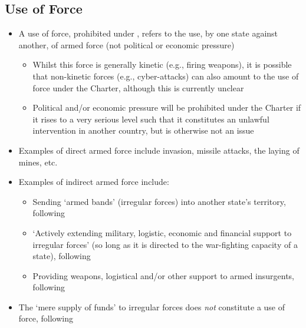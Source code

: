 \subsection{Use of Force}
\begin{itemize}
    \item A use of force, prohibited under , refers to the use, by one state against another, of armed force (not political or economic pressure)
    \begin{itemize}
        \item Whilst this force is generally kinetic (e.g., firing weapons), it is possible that non-kinetic forces (e.g., cyber-attacks) can also amount to the use of force under the Charter, although this is currently unclear
        \item Political and/or economic pressure will be prohibited under the Charter if it rises to a very serious level such that it constitutes an unlawful intervention in another country, but is otherwise not an issue
    \end{itemize}
    \item Examples of direct armed force include invasion, missile attacks, the laying of mines, etc.
    \item Examples of indirect armed force include:
    \begin{itemize}
        \item Sending `armed bands' (irregular forces) into another state's territory, following 
        \item `Actively extending military, logistic, economic and financial support to irregular forces' (so long as it is directed to the war-fighting capacity of a state), following 
        \item Providing weapons, logistical and/or other support to armed insurgents, following 
    \end{itemize}
    \item The `mere supply of funds' to irregular forces does \textit{not} constitute a use of force, following 
\end{itemize}

